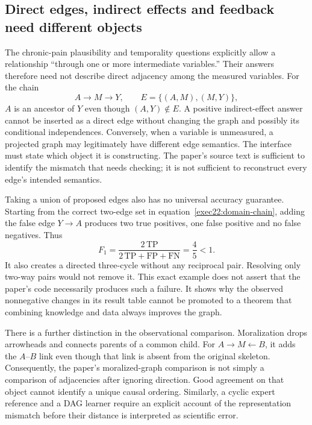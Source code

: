 \subsection{Direct edges, indirect effects and feedback need different objects}
\label{exec22:domain-semantics}

The chronic-pain plausibility and temporality questions explicitly allow a
relationship ``through one or more intermediate variables.'' Their answers
therefore need not describe direct adjacency among the measured variables.
For the chain
\begin{equation}
 A\longrightarrow M\longrightarrow Y,
 \qquad E=\{(A,M),(M,Y)\},
 \label{exec22:domain-chain}
\end{equation}
\(A\) is an ancestor of \(Y\) even though \((A,Y)\notin E\). A positive
indirect-effect answer cannot be inserted as a direct edge without changing the
graph and possibly its conditional independences. Conversely, when a variable
is unmeasured, a projected graph may legitimately have different edge semantics.
The interface must state which object it is constructing. The paper's source
text is sufficient to identify the mismatch that needs checking; it is not
sufficient to reconstruct every edge's intended semantics. \citep{exec22_domain_lin,exec22_domain_reference}

Taking a union of proposed edges also has no universal accuracy guarantee.
Starting from the correct two-edge set in equation~\eqref{exec22:domain-chain},
adding the false edge \(Y\to A\) produces two true positives, one false positive
and no false negatives. Thus
\begin{equation}
 F_1=\frac{2\,\mathrm{TP}}{2\,\mathrm{TP}+\mathrm{FP}+\mathrm{FN}}
     =\frac45<1.
 \label{exec22:domain-f1}
\end{equation}
It also creates a directed three-cycle without any reciprocal pair. Resolving
only two-way pairs would not remove it. This exact example does not assert that
the paper's code necessarily produces such a failure. It shows why the observed
nonnegative changes in its result table cannot be promoted to a theorem that
combining knowledge and data always improves the graph. \citep{exec22_domain_reference}

There is a further distinction in the observational comparison. Moralization
drops arrowheads and connects parents of a common child. For
\(A\to M\leftarrow B\), it adds the \(A\)--\(B\) link even though that link
is absent from the original skeleton. Consequently, the paper's moralized-graph
comparison is not simply a comparison of adjacencies after ignoring direction.
Good agreement on that object cannot identify a unique causal ordering. Similarly,
a cyclic expert reference and a DAG learner require an explicit account of the
representation mismatch before their distance is interpreted as scientific error.

